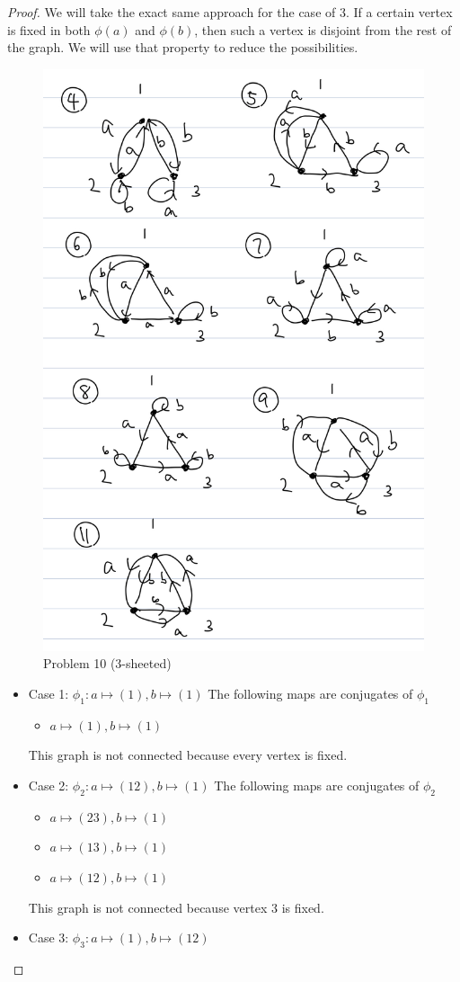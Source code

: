 \documentclass[12pt, psamsfonts]{amsart}
\theoremstyle{definition}
\theoremstyle{remark}
\numberwithin{equation}{section}
\begin{document}
\begin{proof}
  We will take the exact same approach for the case of 3.
  If a certain vertex is fixed in both $\phi(a)$ and $\phi(b)$, then such a vertex is disjoint from the rest of the graph.
  We will use that property to reduce the possibilities.
  \begin{figure}
    \includegraphics[width=.5\linewidth]{problem10_3_sheeted.jpeg}
    \caption{Problem 10 (3-sheeted)}
    \label{fig:problem10_3_sheeted}
  \end{figure}
  \begin{itemize}
    \item Case 1: $\phi_{1}: a \mapsto (1), b \mapsto (1)$
      The following maps are conjugates of $\phi_{1}$
      \begin{itemize}
        \item $a \mapsto (1), b \mapsto (1)$
      \end{itemize}
      This graph is not connected because every vertex is fixed.
    \item Case 2: $\phi_{2}: a \mapsto (12), b \mapsto (1)$
      The following maps are conjugates of $\phi_{2}$
      \begin{itemize}
        \item $a \mapsto (23), b \mapsto (1)$
        \item $a \mapsto (13), b \mapsto (1)$
        \item $a \mapsto (12), b \mapsto (1)$
      \end{itemize}
      This graph is not connected because vertex 3 is fixed.
    \item Case 3: $\phi_{3}: a \mapsto (1), b \mapsto (12)$

\end{itemize}
\end{proof}
\end{document}
